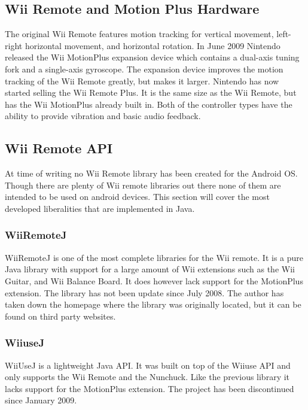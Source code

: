 \documentclass[11pt,twoside,a4paper]{report}
\begin{document}
\subsection{Wii Remote and Motion Plus Hardware}
The original Wii Remote features motion tracking for vertical movement, left-right horizontal movement, and horizontal rotation. %
In June 2009 %
Nintendo released the Wii MotionPlus expansion device which contains a dual-axis tuning fork and a single-axis gyroscope. %
The expansion device improves the motion tracking of the Wii Remote greatly, but makes it larger. Nintendo has now started selling the Wii Remote Plus. It is the same size as the Wii Remote, but has the Wii MotionPlus already built in. Both of the controller types have the ability to provide vibration and basic audio feedback.


\subsection{Wii Remote API}
At time of writing no Wii Remote library has been created for the Android OS. Though there are plenty of Wii remote libraries out there none of them are intended to be used on android devices. This section will cover the most developed liberalities that are implemented in Java.

\subsubsection{WiiRemoteJ}
WiiRemoteJ is one of the most complete libraries for the Wii remote. It is a pure Java library with support for a large amount of Wii extensions such as the Wii Guitar, and Wii Balance Board. It does however lack support for the MotionPlus extension. The library has not been update since July 2008. The author has taken down the homepage where the library was originally located, but it can be found on third party websites. \cite{WiiRemoteJ}

\subsubsection{WiiuseJ}
WiiUseJ is a lightweight Java API. It was built on top of the Wiiuse API and only supports the Wii Remote and the Nunchuck. Like the previous library it lacks support for the MotionPlus extension. The project has been discontinued since January 2009. \cite{Wiiusej}
\end{document}
